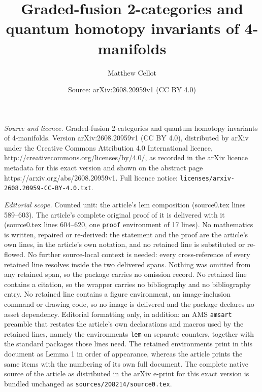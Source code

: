 \documentclass[10pt,a4paper]{amsart}
\title{Graded-fusion 2-categories and quantum homotopy invariants of 4-manifolds}
\author{Matthew Cellot}
\date{Source: arXiv:2608.20959v1 (CC BY 4.0)}
\begin{document}
\maketitle

\noindent\emph{Source and licence.} Graded-fusion 2-categories and quantum homotopy invariants of 4-manifolds. Version arXiv:2608.20959v1 (CC BY 4.0), distributed by arXiv under the Creative Commons Attribution 4.0 International licence, http://creativecommons.org/licenses/by/4.0/, as recorded in the arXiv licence metadata for this exact version and shown on the abstract page https://arxiv.org/abs/2608.20959v1. Full licence notice: \texttt{licenses/arxiv-2608.20959-CC-BY-4.0.txt}.\par\smallskip

\noindent\textit{Editorial scope.} Counted unit: the article's lem composition (source0.tex lines 589--603). The article's complete original proof of it is delivered with it (source0.tex lines 604--620, one \texttt{proof} environment of 17 lines). No mathematics is written, repaired or re-derived: the statement and the proof are the article's own lines, in the article's own notation, and no retained line is substituted or re-flowed.  No further source-local context is needed: every cross-reference of every retained line resolves inside the two delivered spans.  Nothing was omitted from any retained span, so the package carries no omission record.  No retained line contains a citation, so the wrapper carries no bibliography and no bibliography entry.  No retained line contains a figure environment, an image-inclusion command or drawing code, so no image is delivered and the package declares no asset dependency.  Editorial formatting only, in addition: an AMS \texttt{amsart} preamble that restates the article's own declarations and macros used by the retained lines, namely the environments \texttt{lem} on separate counters, together with the standard packages those lines need.  The retained environments print in this document as Lemma 1 in order of appearance, whereas the article prints the same items with the numbering of its own full document.  The complete native source of the article as distributed in the arXiv e-print for this exact version is bundled unchanged as \texttt{sources/208214/source0.tex}.
\end{document}
